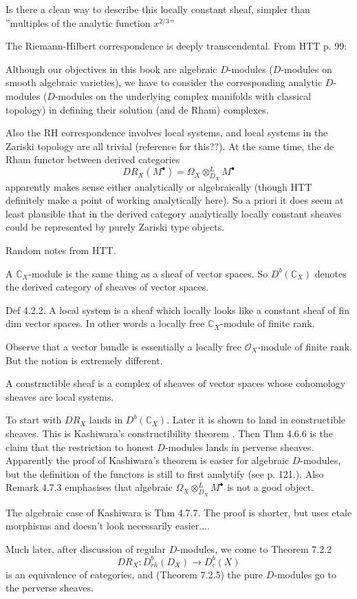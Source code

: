 \documentclass[12pt]{article}
\theoremstyle{plain}
\theoremstyle{definition}
\numberwithin{equation}{section}
\newcommand{\Om}{\Omega}
\newcommand{\C}{\mathbb{C}}
\newcommand{\OO}{\mathcal{O}}
\begin{document}
{\color{red}Is there a clean way to describe this locally constant sheaf, simpler than ''multiples of the analytic function $x^{2/3}$''}

The Riemann-Hilbert correspondence is deeply transcendental. From HTT p. 99:
\begin{displayquote}
Although our objectives in this book are algebraic $D$-modules ($D$-modules on smooth algebraic varieties), we have to consider the corresponding analytic $D$-modules ($D$-modules on the underlying complex manifolds with classical topology) in defining their solution (and de Rham) complexes.
\end{displayquote}
Also the RH correspondence involves local systems, and local systems in the Zariski topology are all trivial (reference for this??). At the same time, the de Rham functor between derived categories
\[
DR_X(M^\bullet) = \Om_X \otimes^L_{D_X} M^\bullet
\]
apparently makes sense either analytically or algebraically (though HTT definitely make a point of working analytically here). So a priori it does seem at least plausible that in the derived category analytically locally constant sheaves could be represented by purely Zariski type objects.


{\color{blue}
Random notes from HTT.

A $\C_X$-module is the same thing as a sheaf of vector spaces. So $D^b(\C_X)$ denotes the derived category of sheaves of vector spaces.

Def 4.2.2. A local system is a sheaf which locally looks like a constant sheaf of fin dim vector spaces. In other words a locally free $\C_X$-module of finite rank.

Observe that a vector bundle is essentially a locally free $\OO_X$-module of finite rank. But the notion is extremely different.

A constructible sheaf is a complex of sheaves of vector spaces whose cohomology sheaves are local systems.

To start with $DR_X$ lands in $D^b(\C_X)$. Later it is shown to land in constructible sheaves. This is Kashiwara's constructibility theorem {\cite[Theorem 4.6.3]{HTT}}. Then Thm 4.6.6 is the claim that the restriction to honest $D$-modules lands in perverse sheaves. Apparently the proof of Kashiwara's theorem is easier for algebraic $D$-modules, but the definition of the functors is still to first analytify (see p. 121.). Also Remark 4.7.3 emphasises that algebraic $\Om_X \otimes^L_{D_X} M^\bullet$ is not a good object.

The algebraic case of Kashiwara is Thm 4.7.7. The proof is shorter, but uses etale morphisms and doesn't look necessarily easier....

Much later, after discussion of regular $D$-modules, we come to Theorem 7.2.2
\[
DR_X : D^b_{rh}(D_X) \rightarrow D^b_c(X)
\]
is an equivalence of categories, and (Theorem 7.2.5) the pure $D$-modules go to the perverse sheaves.

}
\end{document}
